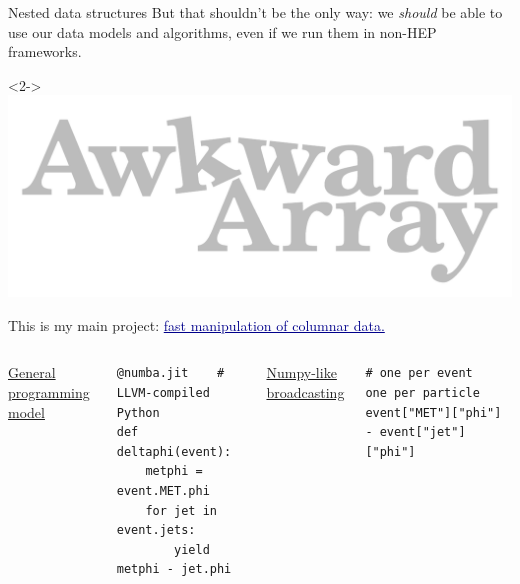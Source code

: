 \documentclass[aspectratio=169]{beamer}
\begin{document}
\begin{frame}[fragile]{Nested data structures}
\large
\vspace{0.4 cm}
But that shouldn't be the only way: we {\it should} be able to use our data models and algorithms, even if we run them in non-HEP frameworks.

\begin{uncoverenv}<2->
\vspace{0.5 cm}
\hfill \includegraphics[height=1 cm]{awkward-logo.pdf}

\vspace{-1 cm}
This is my main project: \textcolor{darkblue}{\underline{fast manipulation of columnar data.}}

\vspace{0.5 cm}
\scriptsize
\begin{columns}[t]
\underline{\large General programming model}

\begin{verbatim}
@numba.jit    # LLVM-compiled Python
def deltaphi(event):
    metphi = event.MET.phi
    for jet in event.jets:
        yield metphi - jet.phi
\end{verbatim}

\underline{\large Numpy-like broadcasting}

\vspace{\baselineskip}
\begin{verbatim}
# one per event       one per particle
event["MET"]["phi"] - event["jet"]["phi"]
\end{verbatim}
\end{columns}
\end{uncoverenv}

\large
\vspace{0.7 cm}
\end{frame}
\end{document}
